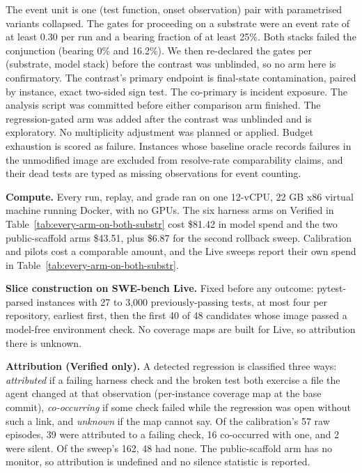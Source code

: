 \documentclass{article}
\begin{document}
The event unit is one (test function, onset observation) pair with parametrised variants collapsed. The gates for proceeding on a substrate were an event rate of at least 0.30 per run and a bearing fraction of at least 25\%. Both stacks failed the conjunction (bearing 0\% and 16.2\%). We then re-declared the gates per (substrate, model stack) before the contrast was unblinded, so no arm here is confirmatory. The contrast's primary endpoint is final-state contamination, paired by instance, exact two-sided sign test. The co-primary is incident exposure. The analysis script was committed before either comparison arm finished. The regression-gated arm was added after the contrast was unblinded and is exploratory. No multiplicity adjustment was planned or applied. Budget exhaustion is scored as failure. Instances whose baseline oracle records failures in the unmodified image are excluded from resolve-rate comparability claims, and their dead tests are typed as missing observations for event counting.

\textbf{Compute.} Every run, replay, and grade ran on one 12-vCPU, 22 GB x86 virtual machine running Docker, with no GPUs. The six harness arms on Verified in Table~\ref{tab:every-arm-on-both-substr} cost \$81.42 in model spend and the two public-scaffold arms \$43.51, plus \$6.87 for the second rollback sweep. Calibration and pilots cost a comparable amount, and the Live sweeps report their own spend in Table~\ref{tab:every-arm-on-both-substr}.

\textbf{Slice construction on SWE-bench Live.} Fixed before any outcome: pytest-parsed instances with 27 to 3,000 previously-passing tests, at most four per repository, earliest first, then the first 40 of 48 candidates whose image passed a model-free environment check. No coverage maps are built for Live, so attribution there is unknown.

\textbf{Attribution (Verified only).} A detected regression is classified three ways: \emph{attributed} if a failing harness check and the broken test both exercise a file the agent changed at that observation (per-instance coverage map at the base commit), \emph{co-occurring} if some check failed while the regression was open without such a link, and \emph{unknown} if the map cannot say. Of the calibration's 57 raw episodes, 39 were attributed to a failing check, 16 co-occurred with one, and 2 were silent. Of the sweep's 162, 48 had none. The public-scaffold arm has no monitor, so attribution is undefined and no silence statistic is reported.
\end{document}
